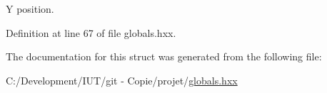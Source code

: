 Y position. 



Definition at line 67 of file globals.\-hxx.



The documentation for this struct was generated from the following file\-:\begin{DoxyCompactItemize}
\item 
C\-:/\-Development/\-I\-U\-T/git -\/ Copie/projet/\hyperlink{globals_8hxx}{globals.\-hxx}\end{DoxyCompactItemize}
